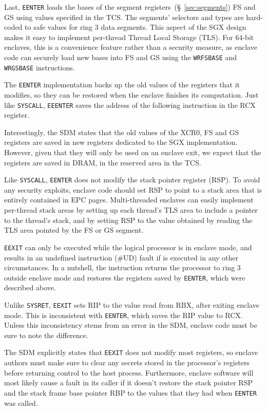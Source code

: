 Last, \texttt{EENTER} loads the bases of the segment
registers~(\S~\ref{sec:segments}) FS and GS using values specified in the TCS.
The segments' selectors and types are hard-coded to safe values for ring 3 data
segments. This aspect of the SGX design makes it easy to implement per-thread
Thread Local Storage (TLS). For 64-bit enclaves, this is a convenience feature
rather than a security measure, as enclave code can securely load new bases
into FS and GS using the \texttt{WRFSBASE} and \texttt{WRGSBASE} instructions.

The \texttt{EENTER} implementation backs up the old values of the registers
that it modifies, so they can be restored when the enclave finishes its
computation. Just like \texttt{SYSCALL}, \texttt{EEENTER} saves the address of
the following instruction in the RCX register.

Interestingly, the SDM states that the old values of the XCR0, FS and GS
registers are saved in new registers dedicated to the SGX implementation.
However, given that they will only be used on an enclave exit, we expect that
the registers are saved in DRAM, in the reserved area in the TCS.

Like \texttt{SYSCALL}, \texttt{EENTER} does not modify the stack pointer
register (RSP). To avoid any security exploits, enclave code should set RSP to
point to a stack area that is entirely contained in EPC pages. Multi-threaded
enclaves can easily implement per-thread stack areas by setting up each
thread's TLS area to include a pointer to the thread's stack, and by setting
RSP to the value obtained by reading the TLS area pointed by the FS or GS
segment.

\texttt{EEXIT} can only be executed while the logical processor is in enclave
mode, and results in an undefined instruction (\#UD) fault if is executed in
any other circumstances. In a nutshell, the instruction returns the processor
to ring 3 outside enclave mode and restores the registers saved by
\texttt{EENTER}, which were described above.

Unlike \texttt{SYSRET}, \texttt{EEXIT} sets RIP to the value read from RBX,
after exiting enclave mode. This is inconsistent with \texttt{EENTER}, which
saves the RIP value to RCX. Unless this inconsistency stems from an error in
the SDM, enclave code must be sure to note the difference.

The SDM explicitly states that \texttt{EEXIT} does not modify most registers,
so enclave authors must make sure to clear any secrets stored in the
processor's registers before returning control to the host process.
Furthermore, enclave software will most likely cause a fault in its caller if
it doesn't restore the stack pointer RSP and the stack frame base pointer RBP
to the values that they had when \texttt{EENTER} was called.

